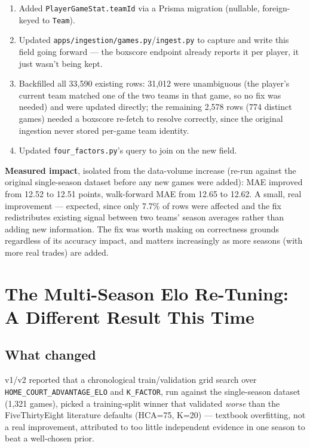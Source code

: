 \documentclass[11pt]{article}
\newcommand{\code}[1]{\allowbreak\texttt{\small #1}\allowbreak}
\begin{document}
\begin{enumerate}
    \item Added \code{PlayerGameStat.teamId} via a Prisma migration (nullable, foreign-keyed to \code{Team}).
    \item Updated \code{apps/ingestion/games.py}/\code{ingest.py} to capture and write this field going
    forward — the boxscore endpoint already reports it per player, it just wasn't being kept.
    \item Backfilled all 33,590 existing rows: 31,012 were unambiguous (the player's current team matched one
    of the two teams in that game, so no fix was needed) and were updated directly; the remaining 2,578 rows
    (774 distinct games) needed a boxscore re-fetch to resolve correctly, since the original ingestion never
    stored per-game team identity.
    \item Updated \code{four\_factors.py}'s query to join on the new field.
\end{enumerate}

\textbf{Measured impact}, isolated from the data-volume increase (re-run against the original single-season
dataset before any new games were added): MAE improved from 12.52 to 12.51 points, walk-forward MAE from
12.65 to 12.62. A small, real improvement — expected, since only 7.7\% of rows were affected and the fix
redistributes existing signal between two teams' season averages rather than adding new information. The fix
was worth making on correctness grounds regardless of its accuracy impact, and matters increasingly as more
seasons (with more real trades) are added.

\section{The Multi-Season Elo Re-Tuning: A Different Result This Time}
\label{sec:elo-retune}

\subsection{What changed}

v1/v2 reported that a chronological train/validation grid search over \code{HOME\_COURT\_ADVANTAGE\_ELO} and
\code{K\_FACTOR}, run against the single-season dataset (1,321 games), picked a training-split winner that
validated \emph{worse} than the FiveThirtyEight literature defaults (HCA=75, K=20) — textbook overfitting, not
a real improvement, attributed to too little independent evidence in one season to beat a well-chosen prior.
\end{document}
